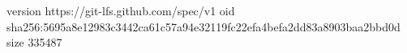 version https://git-lfs.github.com/spec/v1
oid sha256:5695a8e12983c3442ca61c57a94e32119fc22efa4befa2dd83a8903baa2bbd0d
size 335487
